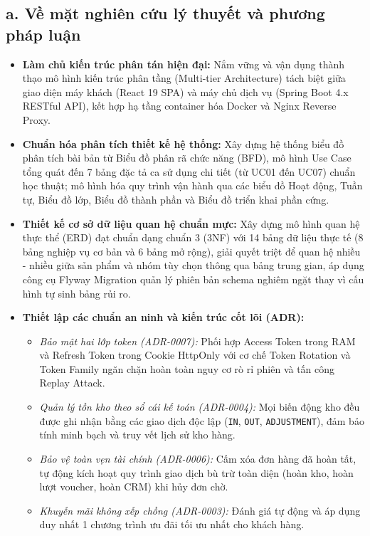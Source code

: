 \subsection*{a. Về mặt nghiên cứu lý thuyết và phương pháp luận}
\begin{itemize}[leftmargin=1.5cm]
    \item \textbf{Làm chủ kiến trúc phân tán hiện đại:} Nắm vững và vận dụng thành thạo mô hình kiến trúc phân tầng (Multi-tier Architecture) tách biệt giữa giao diện máy khách (React 19 SPA) và máy chủ dịch vụ (Spring Boot 4.x RESTful API), kết hợp hạ tầng container hóa Docker và Nginx Reverse Proxy.
    \item \textbf{Chuẩn hóa phân tích thiết kế hệ thống:} Xây dựng hệ thống biểu đồ phân tích bài bản từ Biểu đồ phân rã chức năng (BFD), mô hình Use Case tổng quát đến 7 bảng đặc tả ca sử dụng chi tiết (từ UC01 đến UC07) chuẩn học thuật; mô hình hóa quy trình vận hành qua các biểu đồ Hoạt động, Tuần tự, Biểu đồ lớp, Biểu đồ thành phần và Biểu đồ triển khai phần cứng.
    \item \textbf{Thiết kế cơ sở dữ liệu quan hệ chuẩn mực:} Xây dựng mô hình quan hệ thực thể (ERD) đạt chuẩn dạng chuẩn 3 (3NF) với 14 bảng dữ liệu thực tế (8 bảng nghiệp vụ cơ bản và 6 bảng mở rộng), giải quyết triệt để quan hệ nhiều - nhiều giữa sản phẩm và nhóm tùy chọn thông qua bảng trung gian, áp dụng công cụ Flyway Migration quản lý phiên bản schema nghiêm ngặt thay vì cấu hình tự sinh bảng rủi ro.
    \item \textbf{Thiết lập các chuẩn an ninh và kiến trúc cốt lõi (ADR):}
    \begin{itemize}
        \item \textit{Bảo mật hai lớp token (ADR-0007):} Phối hợp Access Token trong RAM và Refresh Token trong Cookie HttpOnly với cơ chế Token Rotation và Token Family ngăn chặn hoàn toàn nguy cơ rò rỉ phiên và tấn công Replay Attack.
        \item \textit{Quản lý tồn kho theo sổ cái kế toán (ADR-0004):} Mọi biến động kho đều được ghi nhận bằng các giao dịch độc lập (\texttt{IN}, \texttt{OUT}, \texttt{ADJUSTMENT}), đảm bảo tính minh bạch và truy vết lịch sử kho hàng.
        \item \textit{Bảo vệ toàn vẹn tài chính (ADR-0006):} Cấm xóa đơn hàng đã hoàn tất, tự động kích hoạt quy trình giao dịch bù trừ toàn diện (hoàn kho, hoàn lượt voucher, hoàn CRM) khi hủy đơn chờ.
        \item \textit{Khuyến mãi không xếp chồng (ADR-0003):} Đánh giá tự động và áp dụng duy nhất 1 chương trình ưu đãi tối ưu nhất cho khách hàng.
    \end{itemize}
\end{itemize}

